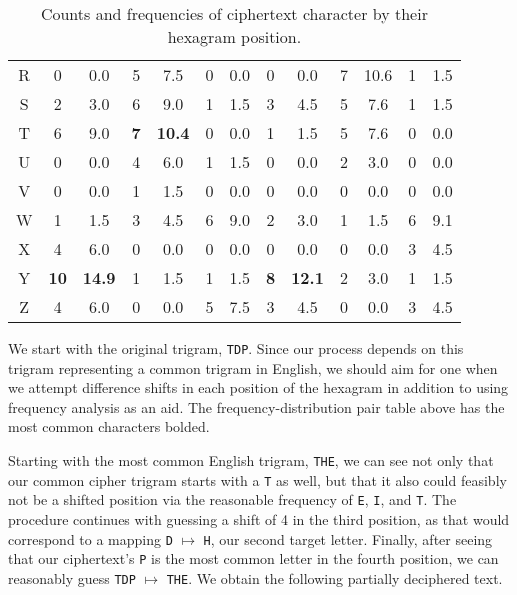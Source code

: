 \documentclass[12pt]{article}
\theoremstyle{remark}  %
\begin{document}
\begin{table}[h]
\begin{center}
\begin{tabular}{c|cc|cc|cc|cc|cc|cc|}
                R & 0 & 0.0 & 5 & 7.5 & 0 & 0.0 & 0 & 0.0 & 7 & 10.6 & 1 & 1.5 \\
                S & 2 & 3.0 & 6 & 9.0 & 1 & 1.5 & 3 & 4.5 & 5 & 7.6 & 1 & 1.5 \\
                T & 6 & 9.0 & \textbf{7} & \textbf{10.4} & 0 & 0.0 & 1 & 1.5 & 5 & 7.6 & 0 & 0.0 \\
                U & 0 & 0.0 & 4 & 6.0 & 1 & 1.5 & 0 & 0.0 & 2 & 3.0 & 0 & 0.0 \\
                V & 0 & 0.0 & 1 & 1.5 & 0 & 0.0 & 0 & 0.0 & 0 & 0.0 & 0 & 0.0 \\
                W & 1 & 1.5 & 3 & 4.5 & 6 & 9.0 & 2 & 3.0 & 1 & 1.5 & 6 & 9.1 \\
                X & 4 & 6.0 & 0 & 0.0 & 0 & 0.0 & 0 & 0.0 & 0 & 0.0 & 3 & 4.5 \\
                Y & \textbf{10} & \textbf{14.9} & 1 & 1.5 & 1 & 1.5 & \textbf{8} & \textbf{12.1} & 2 & 3.0 & 1 & 1.5 \\
                Z & 4 & 6.0 & 0 & 0.0 & 5 & 7.5 & 3 & 4.5 & 0 & 0.0 & 3 & 4.5 \\
            \end{tabular}
        \end{center}
        \captionsetup{labelformat=empty}
        \caption*{Counts and frequencies of ciphertext character by their hexagram position.}
    \end{table}
    We start with the original trigram, \texttt{TDP}. Since our process depends on this trigram representing a common trigram in English, we should aim for one when we attempt difference shifts in each position of the hexagram in addition to using frequency analysis as an aid. The frequency-distribution pair table above has the most common characters bolded. \par Starting with the most common English trigram, \texttt{THE}, we can see not only that our common cipher trigram starts with a \texttt{T} as well, but that it also could feasibly not be a shifted position via the reasonable frequency of \texttt{E}, \texttt{I}, and \texttt{T}. The procedure continues with guessing a shift of 4 in the third position, as that would correspond to a mapping \texttt{D} $\mapsto$ \texttt{H}, our second target letter. Finally, after seeing that our ciphertext's \texttt{P} is the most common letter in the fourth position, we can reasonably guess \texttt{TDP} $\mapsto$ \texttt{THE}. We obtain the following partially deciphered text.
\end{document}
